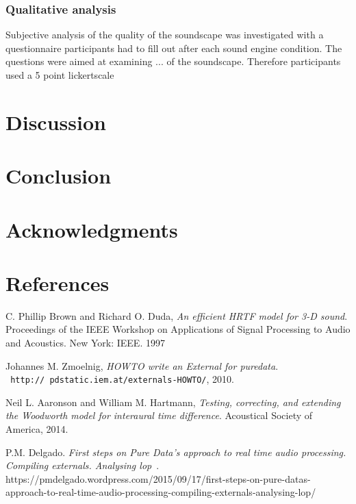 \documentclass[journal]{IEEEtran}
\begin{document}
\subsubsection{Qualitative analysis}
 Subjective analysis of the quality of the soundscape was investigated with a questionnaire participants had to fill out after each sound engine condition. The questions were aimed at examining ... of the soundscape. Therefore participants used a 5 point lickertscale 



\section{Discussion}


\section{Conclusion}




\section*{Acknowledgments}




\pagebreak
\section*{References}

\begin{thebibliography}{4}

C. Phillip Brown and Richard O. Duda, \textit{An efficient HRTF model for 3-D sound}. Proceedings of the IEEE Workshop on Applications of Signal Processing to Audio and Acoustics. New York: IEEE. 1997

Johannes M. Zmoelnig, \textit{HOWTO write an External for puredata}.\\\texttt{ http://
pdstatic.iem.at/externals-HOWTO/}, 2010.

Neil L. Aaronson and William M. Hartmann, \textit{Testing, correcting, and extending the Woodworth model
for interaural time difference}. Acoustical Society of America, 2014.

 P.M. Delgado. \textit{First steps on Pure Data’s approach to real time audio processing. Compiling externals. Analysing lop~}. https://pmdelgado.wordpress.com/2015/09/17/first-steps-on-pure-datas-approach-to-real-time-audio-processing-compiling-externals-analysing-lop/



\end{thebibliography}
\end{document}
